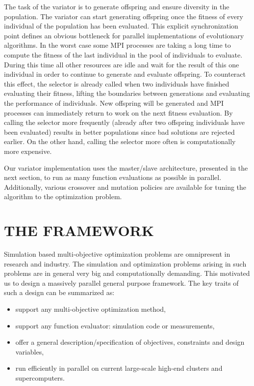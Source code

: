 \documentclass[%
preprint,
preprint,
linenumbers,
amsmath,amssymb,
aps,
prstab,
]{revtex4-1}
\begin{document}
The task of the variator is to generate offspring and ensure diversity in the
  population.
The variator can start generating offspring once the fitness of every
  individual of the population has been evaluated.
This explicit synchronization point defines an obvious bottleneck for parallel
  implementations of evolutionary algorithms.
In the worst case some MPI processes are taking a long time to compute the
  fitness of the last individual in the pool of individuals to evaluate.
During this time all other resources are idle and wait for the result of
  this one individual in order to continue to generate and evaluate offspring.
To counteract this effect, the selector is already called when two individuals
  have finished evaluating their fitness, lifting the boundaries between
  generations and evaluating the performance of individuals.
New offspring will be generated and MPI processes can immediately return to
  work on the next fitness evaluation.
By calling the selector more frequently (already after two offspring
  individuals have been evaluated) results in better populations since bad
  solutions are rejected earlier.
On the other hand, calling the selector more often is computationally more
  expensive.

Our variator implementation uses the master/slave architecture, presented in
  the next section, to run as many function evaluations as possible in parallel.
Additionally, various crossover and mutation policies are available for tuning
  the algorithm to the optimization problem.



\section{THE FRAMEWORK} \label{sec:framework}

Simulation based multi-objective optimization problems are omnipresent in
  research and industry.
The simulation and optimization problems arising in such problems are in
  general very big and computationally demanding.
This motivated us to design a massively parallel general purpose framework.
The key traits of such a design can be summarized as:
%
\begin{itemize}
  \item support any multi-objective optimization method,
  \item support any function evaluator: simulation code or measurements,
  \item offer a general description/specification of objectives, constraints
        and design variables,
  \item run efficiently in parallel on current large-scale high-end clusters
        and supercomputers.
\end{itemize}
%
\end{document}

